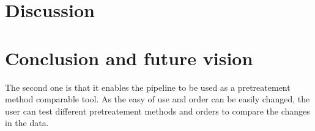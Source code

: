 \documentclass[ENG, BIB]{TFUOC}%
\begin{document}



\chapter{Discussion}

\chapter{Conclusion and future vision}
The second one is that it enables the pipeline to be used as a pretreatement method comparable tool. As the easy of use and order can be easily changed, the user can test different pretreatement methods and orders to compare the changes in the data.
\end{document}
